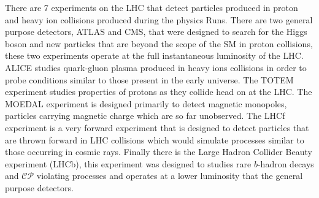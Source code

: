 There are 7 experiments on the LHC that detect particles produced in proton and heavy ion collisions produced during the physics Runs. There are two general purpose detectors, ATLAS and CMS, that were designed to search for the Higgs boson and new particles that are beyond the scope of the SM in proton collisions, these two experiments operate at the full instantaneous luminosity of the LHC. %
ALICE studies quark-gluon plasma produced in heavy ions collisions in order to probe conditions similar to those present in the early universe. The TOTEM experiment studies properties of protons as they collide head on at the LHC. The MOEDAL experiment is designed primarily to detect magnetic monopoles, particles carrying magnetic charge which are so far unobserved. The LHCf experiment is a very forward experiment that is designed to detect particles that are thrown forward in LHC collisions which would simulate processes similar to those occurring in cosmic rays. Finally there is the Large Hadron Collider Beauty experiment (LHCb), this experiment was designed to studies rare $b$-hadron decays and $\mathcal{CP}$ violating processes and operates at a lower luminosity that the general purpose detectors. %




